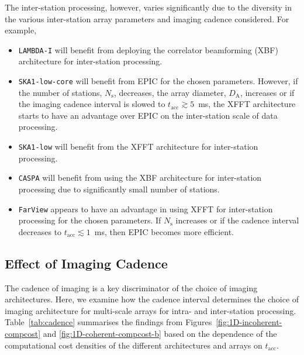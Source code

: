 \documentclass[
  journal=pasa,
  manuscript=article-type,
  year=2020,
  volume=37,
]{cup-journal}
\begin{document}
The inter-station processing, however, varies significantly due to the diversity in the various inter-station array parameters and imaging cadence considered. For example, 
\begin{itemize}
    \item \texttt{LAMBDA-I} will benefit from deploying the correlator beamforming (XBF) architecture for inter-station processing. 
    \item \texttt{SKA1-low-core} will benefit from EPIC for the chosen parameters. However, if the number of stations, $N_\textrm{s}$, decreases,  the array diameter, $D_\textrm{A}$, increases or if the imaging cadence interval is slowed to $t_\textrm{acc} \gtrsim 5$~ms, the XFFT architecture starts to have an advantage over EPIC on the inter-station scale of data processing. 
    \item \texttt{SKA1-low} will benefit from the XFFT architecture for inter-station processing.
    \item \texttt{CASPA} will benefit from using the XBF architecture for inter-station processing due to significantly small number of stations.
    \item \texttt{FarView} appears to have an advantage in using XFFT for inter-station processing for the chosen parameters. If $N_\textrm{s}$ increases or if the cadence interval decreases to $t_\textrm{acc}\lesssim 1$~ms, then EPIC becomes more efficient. 
\end{itemize}

\subsection{Effect of Imaging Cadence}\label{sec:cadence}

The cadence of imaging is a key discriminator of the choice of imaging architectures. Here, we examine how the cadence interval determines the choice of imaging architecture for multi-scale arrays for intra- and inter-station processing. Table~\ref{tab:cadence} summarises the findings from Figures~\ref{fig:1D-incoherent-compcost} and \ref{fig:1D-coherent-compcost-b} based on the dependence of the computational cost densities of the different architectures and arrays on $t_\textrm{acc}$.
\end{document}
